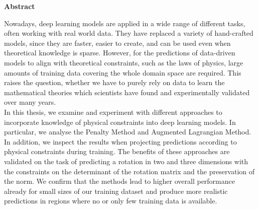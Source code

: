 


\vspace*{2cm}
\begin{center}
{\Large \textbf{Abstract}}
\end{center}
\vspace{1cm}


Nowadays, deep learning models are applied in a wide range of different tasks, often working with real world data. They have replaced a variety of hand-crafted models, since they are faster, easier to create, and can be used even when theoretical knowledge is sparse. However, for the predictions of data-driven models to align with theoretical constraints, such as the laws of physics, large amounts of training data covering the whole domain space are required. This raises the question, whether we have to purely rely on data to learn the mathematical theories which scientists have found and experimentally validated over many years. \\
\indent In this thesis, we examine and experiment with different approaches to incorporate knowledge of physical constraints into deep learning models. In particular, we analyse the Penalty Method and Augmented Lagrangian Method. In addition, we inspect the results when projecting predictions according to physical constraints during training. The benefits of these approaches are validated on the task of predicting a rotation in two and three dimensions with the constraints on the determinant of the rotation matrix and the preservation of the norm. We confirm that the methods lead to higher overall performance already for small sizes of our training dataset and produce more realistic predictions in regions where no or only few training data is available.

